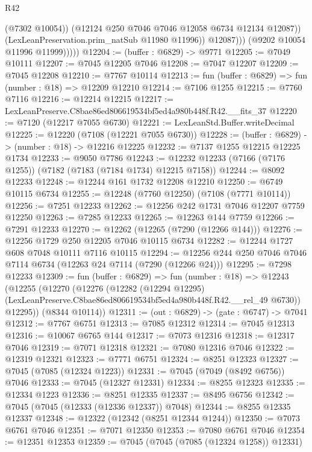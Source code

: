 \begin{lexlean}{R42}
\begin{coremodule}
{                        (@7302 @10054))
                      (@12124 @250 @7046 @7046 @12058 @6734 @12134 @12087))
                    (LexLeanPreservation.prim_natSub @11980 @11996))
                  @12087)))
            (@9202 @10054 @11996 @11999)))))
@12204 := (buffer : @6829) -> @9771
@12205 := @7049 @10111
@12207 := @7045 @12205 @7046
@12208 := @7047 @12207
@12209 := @7045 @12208
@12210 := @7767 @10114
@12213 := fun (buffer : @6829) => fun (number : @18) => @12209 @12210
@12214 := @7106 @1255
@12215 := @7760 @7116
@12216 := @12214 @12215
@12217 := LexLeanPreserve.C8bae86ed806619534bf5ed4a980b448f.R42.__fits_37
@12220 := @7120 (@12217 @7055 @6730)
@12221 := LexLeanStd.Buffer.writeDecimal
@12225 := @12220 (@7108 (@12221 @7055 @6730))
@12228 := (buffer : @6829) -> (number : @18) -> @12216 @12225
@12232 := @7137 @1255 @12215 @12225 @1734
@12233 := @9050 @7786
@12243 := @12232 @12233 (@7166 (@7176 @1255)) (@7182 (@7183 (@7184 @1734) @12215 @7158))
@12244 := @8092 @12233
@12248 := @12244 @161 @1732 @12208 @12210
@12250 := @6749 @10115 @6734
@12255 := @12248 (@7760 @12250) (@7108 (@7771 @10114))
@12256 := @7251 @12233
@12262 := @12256 @242 @1731 @7046 @12207 @7759 @12250
@12263 := @7285 @12233
@12265 := @12263 @144 @7759
@12266 := @7291 @12233
@12270 := @12262 (@12265 (@7290 (@12266 @144)))
@12276 := @12256 @1729 @250 @12205 @7046 @10115 @6734
@12282 := @12244 @1727 @608 @7048 @10111 @7116 @10115
@12294 := @12256 @244 @250 @7046 @7046 @7114 @6734 (@12263 @24 @7114 (@7290 (@12266 @24)))
@12295 := @7298 @12233
@12309 := fun (buffer : @6829) =>
  fun (number : @18) =>
  @12243
    (@12255
      (@12270
        (@12276
          (@12282
            (@12294 @12295)
            (LexLeanPreserve.C8bae86ed806619534bf5ed4a980b448f.R42.__rel_49 @6730))
          @12295))
      (@8344 @10114))
@12311 := (out : @6829) -> (gate : @6747) -> @7041
@12312 := @7767 @6751
@12313 := @7085 @12312
@12314 := @7045 @12313
@12316 := @10067 @6765 @144
@12317 := @7073 @12316
@12318 := @12317 @7046
@12319 := @7071 @12318
@12321 := @7080 @12316 @7046
@12322 := @12319 @12321
@12323 := @7771 @6751
@12324 := @8251 @12323
@12327 := @7045 (@7085 (@12324 @1223))
@12331 := @7045 (@7049 (@8492 @6756)) @7046
@12333 := @7045 (@12327 @12331)
@12334 := @8255 @12323
@12335 := @12334 @1223
@12336 := @8251 @12335
@12337 := @8495 @6756
@12342 := @7045 (@7045 (@12333 (@12336 @12337)) @7048)
@12344 := @8255 @12335 @12337
@12348 := @12322 (@12342 (@8251 @12344 @1244))
@12350 := @7073 @6761 @7046
@12351 := @7071 @12350
@12353 := @7080 @6761 @7046
@12354 := @12351 @12353
@12359 := @7045 (@7045 (@7085 (@12324 @1258)) @12331)
}
\end{coremodule}
\end{lexlean}
